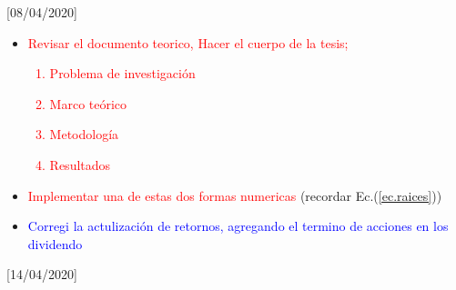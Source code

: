 \documentclass[a4paper,14pt]{article}
\begin{document}
[08/04/2020]

\begin{itemize}
\item \textcolor{red}{Revisar el documento teorico, Hacer el cuerpo de la tesis;
\begin{enumerate}
\item Problema de investigación
\item Marco teórico
\item Metodología
\item Resultados
\end{enumerate}}
\item \textcolor{red}{Implementar una de estas dos formas numericas} (recordar Ec.(\ref{ec.raices}))
\item \textcolor{blue}{Corregi la actulización de retornos, agregando el termino de acciones en los dividendo }
\end{itemize}

[14/04/2020]
\end{document}
